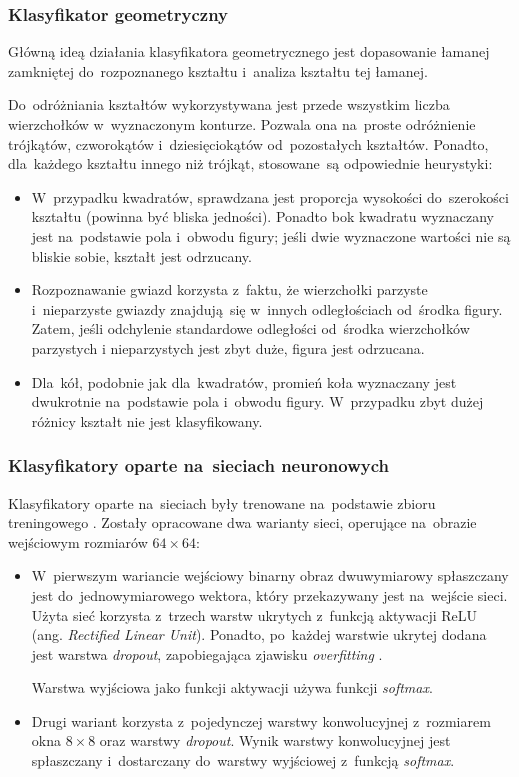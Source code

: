 \documentclass[11pt,a4paper]{article}
\begin{document}
\subsubsection{Klasyfikator geometryczny}

Główną ideą działania klasyfikatora geometrycznego jest dopasowanie łamanej zamkniętej do~rozpoznanego kształtu i~analiza kształtu tej łamanej.

Do~odróżniania kształtów wykorzystywana jest przede wszystkim liczba wierzchołków w~wyznaczonym konturze.
Pozwala ona na~proste odróżnienie trójkątów, czworokątów i~dziesięciokątów od~pozostałych kształtów.
Ponadto, dla~każdego kształtu innego niż trójkąt, stosowane~są odpowiednie heurystyki:

\begin{itemize}
    \item W~przypadku kwadratów, sprawdzana jest proporcja wysokości do~szerokości kształtu (powinna być bliska jedności).
    Ponadto bok kwadratu wyznaczany jest na~podstawie pola i~obwodu figury; jeśli dwie wyznaczone wartości nie są bliskie sobie, kształt jest odrzucany.
    \item Rozpoznawanie gwiazd korzysta z~faktu, że wierzchołki parzyste i~nieparzyste gwiazdy znajdują~się w~innych odległościach od~środka figury.
    Zatem, jeśli odchylenie standardowe odległości od~środka wierzchołków parzystych i nieparzystych jest zbyt duże, figura jest odrzucana.
    \item Dla~kół, podobnie jak dla~kwadratów, promień koła wyznaczany jest dwukrotnie na~podstawie pola i~obwodu figury.
    W~przypadku zbyt dużej różnicy kształt nie jest klasyfikowany.
\end{itemize}

\subsubsection{Klasyfikatory oparte na~sieciach neuronowych}

Klasyfikatory oparte na~sieciach były trenowane na~podstawie zbioru treningowego \cite{shapes}.
Zostały opracowane dwa warianty sieci, operujące na~obrazie wejściowym rozmiarów $64 \times 64$:

\begin{itemize}
    \item W~pierwszym wariancie wejściowy binarny obraz dwuwymiarowy spłaszczany jest do~jednowymiarowego wektora, który przekazywany jest na~wejście sieci.
    Użyta sieć korzysta z~trzech warstw ukrytych z~funkcją aktywacji ReLU (ang. \emph{Rectified Linear Unit}).
    Ponadto, po~każdej warstwie ukrytej dodana jest warstwa \emph{dropout}, zapobiegająca zjawisku \emph{overfitting} \cite{srivastava2014}.

    Warstwa wyjściowa jako funkcji aktywacji używa funkcji \emph{softmax}.
    \item Drugi wariant korzysta z~pojedynczej warstwy konwolucyjnej z~rozmiarem okna $8 \times 8$ oraz warstwy \emph{dropout}.
    Wynik warstwy konwolucyjnej jest spłaszczany i~dostarczany do~warstwy wyjściowej z~funkcją \emph{softmax}.
\end{itemize}
\end{document}
